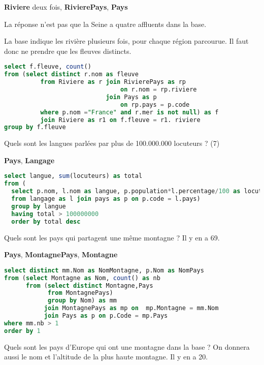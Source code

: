 {\bf Riviere} deux fois, {\bf RivierePays}, {\bf Pays}

La réponse n'est pas que la Seine a quatre affluents dans la base.
\begin{Answer}
La base  indique les rivière plusieurs fois, pour chaque région parcourue. Il faut donc ne prendre que les fleuves distincts.
\begin{lstlisting}[language=SQL]
select f.fleuve, count()
from (select distinct r.nom as fleuve
          from Riviere as r join RivierePays as rp 
                                on r.nom = rp.riviere
                            join Pays as p 
                                on rp.pays = p.code
          where p.nom ="France" and r.mer is not null) as f
		  join Riviere as r1 on f.fleuve = r1. riviere
group by f.fleuve
\end{lstlisting}
\end{Answer}
\begin{Exercise}
Quels sont les langues parlées par plus de 100.000.000 locuteurs ?
(7)
\end{Exercise}

{\bf Pays}, {\bf Langage}
\begin{Answer}
\begin{lstlisting}[language=SQL]
select langue, sum(locuteurs) as total
from (
  select p.nom, l.nom as langue, p.population*l.percentage/100 as locuteurs
  from langage as l join pays as p on p.code = l.pays)
  group by langue
  having total > 100000000
  order by total desc

\end{lstlisting}
\newpage
\end{Answer}
\begin{Exercise}
Quels sont les pays qui partagent une même montagne ? Il y en a 69.
\end{Exercise}

{\bf Pays}, {\bf MontagnePays}, {\bf Montagne}
\begin{Answer}
\begin{lstlisting}[language=SQL]
select distinct mm.Nom as NomMontagne, p.Nom as NomPays
from (select Montagne as Nom, count() as nb
      from (select distinct Montagne,Pays 
            from MontagnePays)
            group by Nom) as mm
           join MontagnePays as mp on  mp.Montagne = mm.Nom
           join Pays as p on p.Code = mp.Pays
where mm.nb > 1
order by 1
\end{lstlisting}
\end{Answer}
\begin{Exercise}
Quels sont les pays d'Europe qui ont une montagne dans la base ? On donnera aussi le nom et l'altitude de la plus haute montagne. Il y en a 20.
\end{Exercise}

